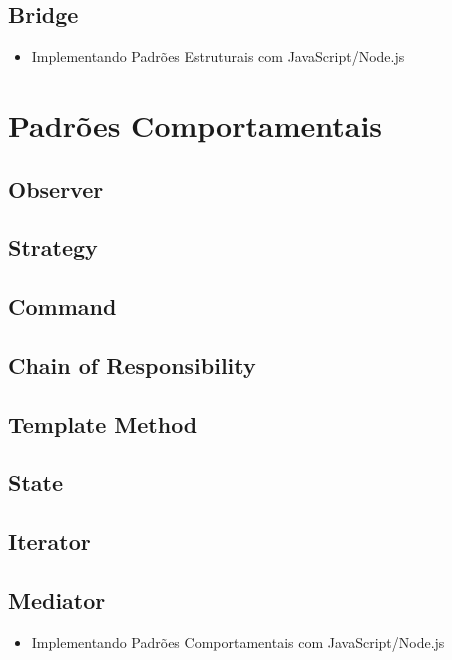 \subsection{Bridge}
\begin{itemize}
\item Implementando Padrões Estruturais com JavaScript/Node.js
\end{itemize}


\section{Padrões Comportamentais}

\subsection{Observer}
\subsection{Strategy}
\subsection{Command}
\subsection{Chain of Responsibility}
\subsection{Template Method}
\subsection{State}
\subsection{Iterator}
\subsection{Mediator}
\begin{itemize}
\item Implementando Padrões Comportamentais com JavaScript/Node.js
\end{itemize}















